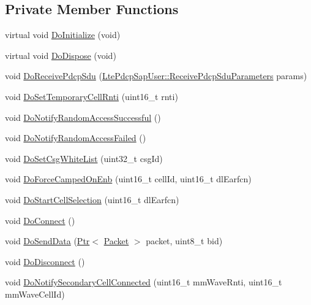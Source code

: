 \subsection*{Private Member Functions}
\begin{DoxyCompactItemize}
\item 
virtual void \hyperlink{classns3_1_1LteUeRrc_a34156554394a4f177f3a34f71eaa3fa8}{Do\+Initialize} (void)
\item 
virtual void \hyperlink{classns3_1_1LteUeRrc_af0283d373f0c5b7a5e6ae33c7ee539da}{Do\+Dispose} (void)
\item 
void \hyperlink{classns3_1_1LteUeRrc_aac2f8d3100748ce39715e03de820cf61}{Do\+Receive\+Pdcp\+Sdu} (\hyperlink{structns3_1_1LtePdcpSapUser_1_1ReceivePdcpSduParameters}{Lte\+Pdcp\+Sap\+User\+::\+Receive\+Pdcp\+Sdu\+Parameters} params)
\item 
void \hyperlink{classns3_1_1LteUeRrc_a616da32c356045a6d548fc578f0ef8be}{Do\+Set\+Temporary\+Cell\+Rnti} (uint16\+\_\+t rnti)
\item 
void \hyperlink{classns3_1_1LteUeRrc_a3876ab1fee7f075bec56008349b147db}{Do\+Notify\+Random\+Access\+Successful} ()
\item 
void \hyperlink{classns3_1_1LteUeRrc_a1b8029d874c7eea580030d17a670b7fb}{Do\+Notify\+Random\+Access\+Failed} ()
\item 
void \hyperlink{classns3_1_1LteUeRrc_a5ec154f19e3f7eec16dc71c5fabec749}{Do\+Set\+Csg\+White\+List} (uint32\+\_\+t csg\+Id)
\item 
void \hyperlink{classns3_1_1LteUeRrc_aeee512cb390cfb5de6a6631b6774ae84}{Do\+Force\+Camped\+On\+Enb} (uint16\+\_\+t cell\+Id, uint16\+\_\+t dl\+Earfcn)
\item 
void \hyperlink{classns3_1_1LteUeRrc_ad46b3f9593e3ed1f94ef646543ec638a}{Do\+Start\+Cell\+Selection} (uint16\+\_\+t dl\+Earfcn)
\item 
void \hyperlink{classns3_1_1LteUeRrc_a21884056aa444fe4f403169991046290}{Do\+Connect} ()
\item 
void \hyperlink{classns3_1_1LteUeRrc_a895988c12c8bc333edbb53f8bde307f0}{Do\+Send\+Data} (\hyperlink{classns3_1_1Ptr}{Ptr}$<$ \hyperlink{classns3_1_1Packet}{Packet} $>$ packet, uint8\+\_\+t bid)
\item 
void \hyperlink{classns3_1_1LteUeRrc_a19261f50e28cce9c61d12c205d45a651}{Do\+Disconnect} ()
\item 
void \hyperlink{classns3_1_1LteUeRrc_af58288bd9b22394d6027beae67104bd1}{Do\+Notify\+Secondary\+Cell\+Connected} (uint16\+\_\+t mm\+Wave\+Rnti, uint16\+\_\+t mm\+Wave\+Cell\+Id)

\end{DoxyCompactItemize}
